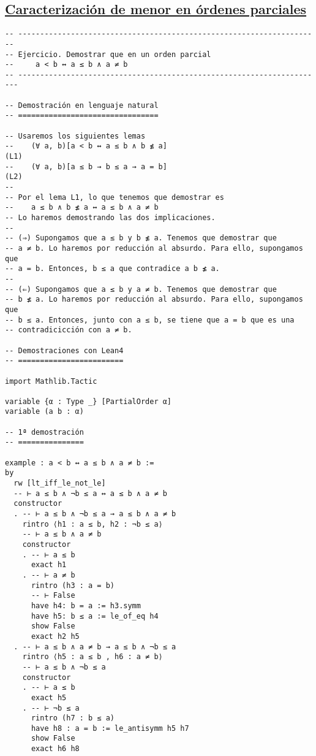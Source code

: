 \subsection{\href{./src/Logica/Caracterizacion\_de\_menor\_en\_ordenes\_parciales.lean}{Caracterización de menor en órdenes parciales}}
\label{sec:org5b3d162}
\begin{verbatim}
-- ---------------------------------------------------------------------
-- Ejercicio. Demostrar que en un orden parcial
--     a < b ↔ a ≤ b ∧ a ≠ b
-- ----------------------------------------------------------------------

-- Demostración en lenguaje natural
-- ================================

-- Usaremos los siguientes lemas
--    (∀ a, b)[a < b ↔ a ≤ b ∧ b ≰ a]                               (L1)
--    (∀ a, b)[a ≤ b → b ≤ a → a = b]                               (L2)
--
-- Por el lema L1, lo que tenemos que demostrar es
--    a ≤ b ∧ b ≰ a ↔ a ≤ b ∧ a ≠ b
-- Lo haremos demostrando las dos implicaciones.
--
-- (⇒) Supongamos que a ≤ b y b ≰ a. Tenemos que demostrar que
-- a ≠ b. Lo haremos por reducción al absurdo. Para ello, supongamos que
-- a = b. Entonces, b ≤ a que contradice a b ≰ a.
--
-- (⇐) Supongamos que a ≤ b y a ≠ b. Tenemos que demostrar que
-- b ≰ a. Lo haremos por reducción al absurdo. Para ello, supongamos que
-- b ≤ a. Entonces, junto con a ≤ b, se tiene que a = b que es una
-- contradicicción con a ≠ b.

-- Demostraciones con Lean4
-- ========================

import Mathlib.Tactic

variable {α : Type _} [PartialOrder α]
variable (a b : α)

-- 1ª demostración
-- ===============

example : a < b ↔ a ≤ b ∧ a ≠ b :=
by
  rw [lt_iff_le_not_le]
  -- ⊢ a ≤ b ∧ ¬b ≤ a ↔ a ≤ b ∧ a ≠ b
  constructor
  . -- ⊢ a ≤ b ∧ ¬b ≤ a → a ≤ b ∧ a ≠ b
    rintro ⟨h1 : a ≤ b, h2 : ¬b ≤ a⟩
    -- ⊢ a ≤ b ∧ a ≠ b
    constructor
    . -- ⊢ a ≤ b
      exact h1
    . -- ⊢ a ≠ b
      rintro (h3 : a = b)
      -- ⊢ False
      have h4: b = a := h3.symm
      have h5: b ≤ a := le_of_eq h4
      show False
      exact h2 h5
  . -- ⊢ a ≤ b ∧ a ≠ b → a ≤ b ∧ ¬b ≤ a
    rintro ⟨h5 : a ≤ b , h6 : a ≠ b⟩
    -- ⊢ a ≤ b ∧ ¬b ≤ a
    constructor
    . -- ⊢ a ≤ b
      exact h5
    . -- ⊢ ¬b ≤ a
      rintro (h7 : b ≤ a)
      have h8 : a = b := le_antisymm h5 h7
      show False
      exact h6 h8


\end{verbatim}
